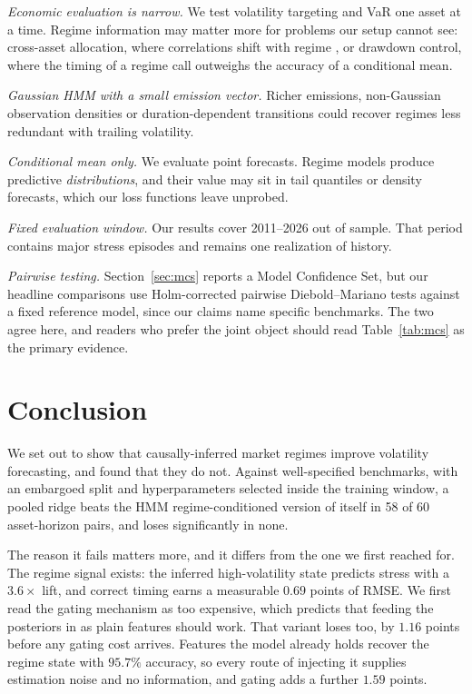 \documentclass[sigconf,nonacm]{acmart}
\begin{document}
\emph{Economic evaluation is narrow.} We test volatility targeting and VaR one
asset at a time. Regime information may matter more for problems our setup cannot
see: cross-asset allocation, where correlations shift with regime
\cite{guidolin2007}, or drawdown control, where the timing of a regime call
outweighs the accuracy of a conditional mean.

\emph{Gaussian HMM with a small emission vector.} Richer emissions, non-Gaussian
observation densities or duration-dependent transitions could recover regimes
less redundant with trailing volatility.

\emph{Conditional mean only.} We evaluate point forecasts. Regime models produce
predictive \emph{distributions}, and their value may sit in tail quantiles or
density forecasts, which our loss functions leave unprobed.

\emph{Fixed evaluation window.} Our results cover 2011--2026 out of sample. That
period contains major stress episodes and remains one realization of history.

\emph{Pairwise testing.} Section~\ref{sec:mcs} reports a Model Confidence Set, but
our headline comparisons use Holm-corrected pairwise Diebold--Mariano tests
against a fixed reference model, since our claims name specific benchmarks. The
two agree here, and readers who prefer the joint object should read
Table~\ref{tab:mcs} as the primary evidence.

\section{Conclusion}

We set out to show that causally-inferred market regimes improve volatility
forecasting, and found that they do not. Against well-specified benchmarks,
with an embargoed split and hyperparameters selected inside the training window,
a pooled ridge beats the HMM regime-conditioned version of itself in 58 of 60
asset-horizon pairs, and loses significantly in none.

The reason it fails matters more, and it differs from the one we first reached
for. The regime signal exists: the inferred high-volatility state predicts stress
with a $3.6\times$ lift, and correct timing earns a measurable $0.69$ points of
RMSE. We first read the gating mechanism as too expensive, which predicts that
feeding the posteriors in as plain features should work. That variant loses too,
by $1.16$ points before any gating cost arrives. Features the model already holds
recover the regime state with $95.7\%$ accuracy, so every route of injecting it
supplies estimation noise and no information, and gating adds a further $1.59$
points.
\end{document}
